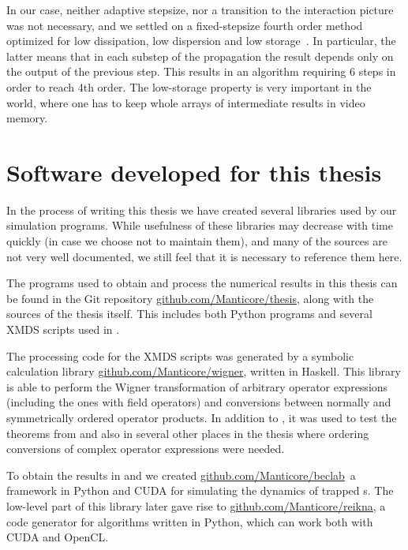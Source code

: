 In our case, neither adaptive stepsize, nor a transition to the interaction picture was not necessary, and we settled on a fixed-stepsize fourth order  method optimized for low dissipation, low dispersion and low storage~\cite{Berland2006}.
In particular, the latter means that in each substep of the  propagation the result depends only on the output of the previous step.
This results in an algorithm requiring 6 steps in order to reach 4th order.
The low-storage property is very important in the  world, where one has to keep whole arrays of intermediate results in video memory.


\section{Software developed for this thesis}

In the process of writing this thesis we have created several libraries used by our simulation programs.
While usefulness of these libraries may decrease with time quickly (in case we choose not to maintain them), and many of the sources are not very well documented, we still feel that it is necessary to reference them here.

The programs used to obtain and process the numerical results in this thesis can be found in the Git repository \href{http://github.com/Manticore/thesis}{github.com/Manticore/thesis}, along with the sources of the thesis itself.
This includes both Python programs and several XMDS scripts used in .

The processing code for the XMDS scripts was generated by a symbolic calculation library \href{http://github.com/Manticore/wigner}{github.com/Manticore/wigner}, written in Haskell.
This library is able to perform the Wigner transformation of arbitrary operator expressions (including the ones with field operators) and conversions between normally and symmetrically ordered operator products.
In addition to , it was used to test the theorems from  and also in several other places in the thesis where ordering conversions of complex operator expressions were needed.

To obtain the results in  and  we created \href{http://github.com/Manticore/beclab}{github.com/Manticore/beclab} a framework in Python and CUDA for simulating the dynamics of trapped s.
The low-level part of this library later gave rise to \href{http://github.com/Manticore/reikna}{github.com/Manticore/reikna}, a code generator for  algorithms written in Python, which can work both with CUDA and OpenCL.
